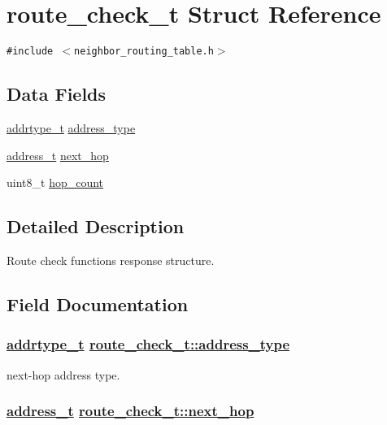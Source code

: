 \hypertarget{structroute__check__t}{
\section{route\_\-check\_\-t Struct Reference}
\label{structroute__check__t}
}
{\tt \#include $<$neighbor\_\-routing\_\-table.h$>$}

\subsection*{Data Fields}
\begin{CompactItemize}
\item 
\hyperlink{address_8h_faf76b5591da0abd0584dec411d0551d}{addrtype\_\-t} \hyperlink{structroute__check__t_340f22861b8c93d6b975d22d5b009302}{address\_\-type}
\item 
\hyperlink{address_8h_65ce5a1faf29ab669a1d3dc6ce26c2ab}{address\_\-t} \hyperlink{structroute__check__t_9bac5aab9dc6d8ff6209bbf6b8c7a75d}{next\_\-hop}
\item 
uint8\_\-t \hyperlink{structroute__check__t_b0c86ee96d76aa0b4de637e3eea1c831}{hop\_\-count}
\end{CompactItemize}


\subsection{Detailed Description}
Route check functions response structure. 



\subsection{Field Documentation}
\hypertarget{structroute__check__t_340f22861b8c93d6b975d22d5b009302}{
\subsubsection[address\_\-type]{\setlength{\rightskip}{0pt plus 5cm}\hyperlink{address_8h_faf76b5591da0abd0584dec411d0551d}{addrtype\_\-t} \hyperlink{structroute__check__t_340f22861b8c93d6b975d22d5b009302}{route\_\-check\_\-t::address\_\-type}}}
\label{structroute__check__t_340f22861b8c93d6b975d22d5b009302}


next-hop address type. \hypertarget{structroute__check__t_9bac5aab9dc6d8ff6209bbf6b8c7a75d}{
\subsubsection[next\_\-hop]{\setlength{\rightskip}{0pt plus 5cm}\hyperlink{address_8h_65ce5a1faf29ab669a1d3dc6ce26c2ab}{address\_\-t} \hyperlink{structroute__check__t_9bac5aab9dc6d8ff6209bbf6b8c7a75d}{route\_\-check\_\-t::next\_\-hop}}}
\label{structroute__check__t_9bac5aab9dc6d8ff6209bbf6b8c7a75d}



